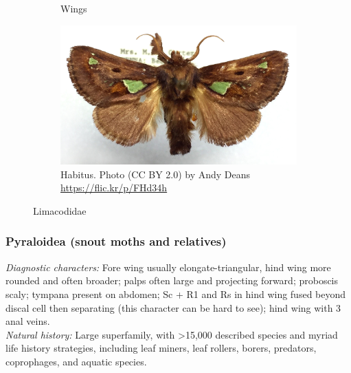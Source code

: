 \documentclass[letterpaper, 11pt]{article}
\begin{document}
\begin{figure}[ht!]
\begin{subfigure}[ht!]{0.3\textwidth}
        \caption{Wings \citep[Fig. 349]{comstock1918wings}}
        \label{fig:limacodid1}
    \end{subfigure}
    \hfill %
    \begin{subfigure}[ht!]{0.55\textwidth}
        \includegraphics[width=\textwidth]{LimacodidHabitus}
        \caption{Habitus. Photo (CC BY 2.0) by Andy Deans \url{https://flic.kr/p/FHd34h}}
        \label{fig:limacodid2}
    \end{subfigure}
    \caption{Limacodidae}\label{fig:limacodids}
\end{figure}

\subsubsection{Pyraloidea (snout moths and relatives)}
\noindent{}\textit{Diagnostic characters:} Fore wing usually elongate-triangular, hind wing more rounded and often broader; palps often large and projecting forward; proboscis scaly; tympana present on abdomen; Sc + R1 and Rs in hind wing fused beyond discal cell then separating (this character can be hard to see); hind wing with 3 anal veins.\\

\noindent{}\textit{Natural history:} Large superfamily, with \textgreater{}15,000 described species and myriad life history strategies, including leaf miners, leaf rollers, borers, predators, coprophages, and aquatic species. 

\end{document}
